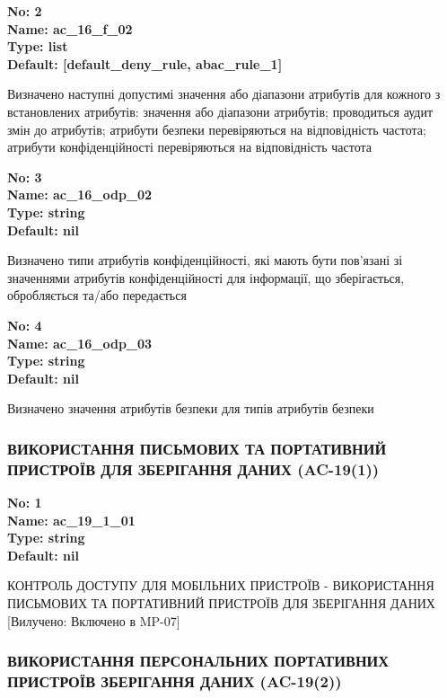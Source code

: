 \documentclass{article}
\begin{document}
{\footnotesize\bfseries
No: 2\\
Name: ac\_16\_f\_02\\
Type: list\\
Default: [\textquotedbl{}default\_deny\_rule\textquotedbl{}, \textquotedbl{}abac\_rule\_1\textquotedbl{}]
}

{\footnotesize Визначено наступні допустимі значення або діапазони атрибутів для кожного з встановлених атрибутів: значення або діапазони атрибутів; проводиться аудит змін до атрибутів; атрибути безпеки перевіряються на відповідність частота; атрибути конфіденційності перевіряються на відповідність частота}


{\footnotesize\bfseries
No: 3\\
Name: ac\_16\_odp\_02\\
Type: string\\
Default: nil
}

{\footnotesize Визначено типи атрибутів конфіденційності, які мають бути пов'язані зі значеннями атрибутів конфіденційності для інформації, що зберігається, обробляється та/або передається}


{\footnotesize\bfseries
No: 4\\
Name: ac\_16\_odp\_03\\
Type: string\\
Default: nil
}

{\footnotesize Визначено значення атрибутів безпеки для типів атрибутів безпеки}




\subsubsection{ВИКОРИСТАННЯ ПИСЬМОВИХ ТА ПОРТАТИВНИЙ ПРИСТРОЇВ ДЛЯ ЗБЕРІГАННЯ ДАНИХ (AC-19(1))}


\vspace{10pt}
{\footnotesize\bfseries
No: 1\\
Name: ac\_19\_1\_01\\
Type: string\\
Default: nil
}

{\footnotesize КОНТРОЛЬ ДОСТУПУ ДЛЯ МОБІЛЬНИХ ПРИСТРОЇВ - ВИКОРИСТАННЯ ПИСЬМОВИХ ТА ПОРТАТИВНИЙ ПРИСТРОЇВ ДЛЯ ЗБЕРІГАННЯ ДАНИХ [Вилучено: Включено в MP-07]}




\subsubsection{ВИКОРИСТАННЯ ПЕРСОНАЛЬНИХ ПОРТАТИВНИХ ПРИСТРОЇВ ЗБЕРІГАННЯ ДАНИХ (AC-19(2))}
\end{document}
